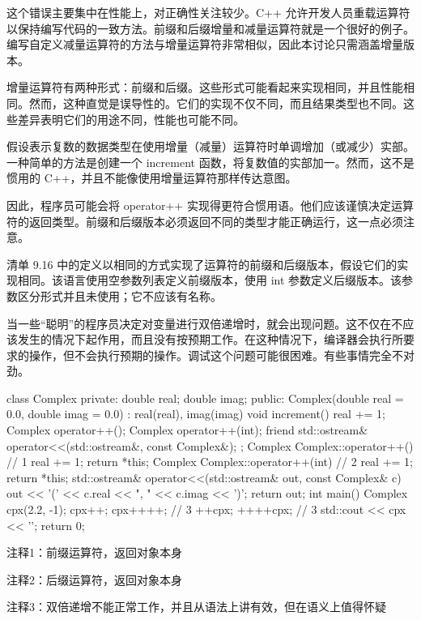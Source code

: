 这个错误主要集中在性能上，对正确性关注较少。C++ 允许开发人员重载运算符以保持编写代码的一致方法。前缀和后缀增量和减量运算符就是一个很好的例子。编写自定义减量运算符的方法与增量运算符非常相似，因此本讨论只需涵盖增量版本。

增量运算符有两种形式：前缀和后缀。这些形式可能看起来实现相同，并且性能相同。然而，这种直觉是误导性的。它们的实现不仅不同，而且结果类型也不同。这些差异表明它们的用途不同，性能也可能不同。


假设表示复数的数据类型在使用增量（减量）运算符时单调增加（或减少）实部。一种简单的方法是创建一个 increment 函数，将复数值的实部加一。然而，这不是惯用的 C++，并且不能像使用增量运算符那样传达意图。

因此，程序员可能会将 operator++ 实现得更符合惯用语。他们应该谨慎决定运算符的返回类型。前缀和后缀版本必须返回不同的类型才能正确运行，这一点必须注意。

清单 9.16 中的定义以相同的方式实现了运算符的前缀和后缀版本，假设它们的实现相同。该语言使用空参数列表定义前缀版本，使用 int 参数定义后缀版本。该参数区分形式并且未使用；它不应该有名称。

当一些“聪明”的程序员决定对变量进行双倍递增时，就会出现问题。这不仅在不应该发生的情况下起作用，而且没有按预期工作。在这种情况下，编译器会执行所要求的操作，但不会执行预期的操作。调试这个问题可能很困难。有些事情完全不对劲。


\begin{cpp}
class Complex {
private:
  double real;
  double imag;
public:
  Complex(double real = 0.0, double imag = 0.0) : real(real), imag(imag) {}
  void increment() { real += 1; }
  Complex operator++();
  Complex operator++(int);
friend std::ostream& operator<<(std::ostream&, const Complex&);
};
Complex Complex::operator++() { // 1
  real += 1;
  return *this;
}
Complex Complex::operator++(int) { // 2
  real += 1;
  return *this;
}
std::ostream& operator<<(std::ostream& out, const Complex& c) {
  out << '(' << c.real << ", " << c.imag << ')';
  return out;
}
int main() {
  Complex cpx(2.2, -1);
  cpx++;
  cpx++++; // 3
  ++cpx;
  ++++cpx; // 3
  std::cout << cpx << '\n';
  return 0;
}
\end{cpp}

{\footnotesize
注释1：前缀运算符，返回对象本身

注释2：后缀运算符，返回对象本身

注释3：双倍递增不能正常工作，并且从语法上讲有效，但在语义上值得怀疑
}

